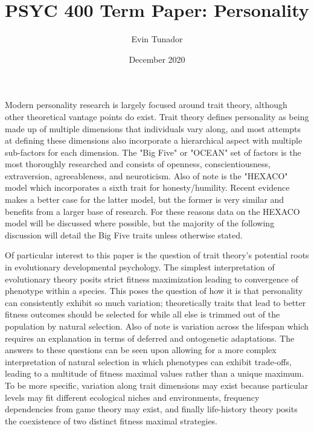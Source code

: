 \documentclass[a4paper, 12pt]{article}
\title{PSYC 400 Term Paper: Personality}
\author{Evin Tunador}
\date{December 2020}
\begin{document}
{\tiny\maketitle}
\doublespacing

Modern personality research is largely focused around trait theory, although other theoretical vantage points do exist. Trait theory defines personality as being made up of multiple dimensions that individuals vary along, and most attempts at defining these dimensions also incorporate a hierarchical aspect with multiple sub-factors  for each dimension. The "Big Five" or "OCEAN" set of factors is the most thoroughly researched and consists of openness, conscientiousness, extraversion, agreeableness, and neuroticism. Also of note is the "HEXACO" model which incorporates a sixth trait for honesty/humility. Recent evidence makes a better case for the latter model, but the former is very similar and benefits from a larger base of research. For these reasons data on the HEXACO model will be discussed where possible, but the majority of the following discussion will detail the Big Five traits unless otherwise stated. \par


Of particular interest to this paper is the question of trait theory's potential roots in evolutionary developmental psychology. The simplest interpretation of evolutionary theory posits strict fitness maximization leading to convergence of phenotype within a species. This poses the question of how it is that personality can consistently exhibit so much variation; theoretically traits that lead to better fitness outcomes should be selected for while all else is trimmed out of the population by natural selection. Also of note is variation across the lifespan which requires an explanation in terms of deferred and ontogenetic adaptations. The answers to these questions can be seen upon allowing for a more complex interpretation of natural selection in which phenotypes can exhibit trade-offs, leading to a multitude of fitness maximal values rather than a unique maximum. To be more specific, variation along trait dimensions may exist because particular levels may fit different ecological niches and environments, frequency dependencies from game theory may exist, and finally life-history theory posits the coexistence of two distinct fitness maximal strategies. \par
\end{document}
